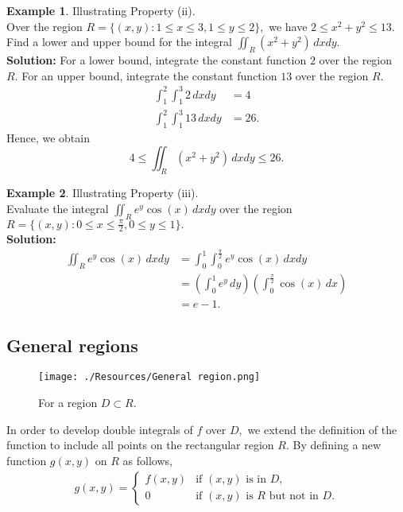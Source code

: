 \documentclass[12pt, a4paper]{article}
\newcommand{\f}[2]{\frac{#1}{#2}}
\theoremstyle{definition}
\newtheorem*{example}{Example}
\theoremstyle{plain}
\begin{document}
\begin{example}
Illustrating Property (ii). \\
Over the region $R=\{(x,y): 1\leq x \leq 3, 1\leq y \leq 2\},$ we have $2\leq x^2+y^2\leq 13.$ Find a lower and upper bound for the integral $\iint_R (x^2+y^2) \, dxdy.$ \\
\textbf{Solution:} For a lower bound, integrate the constant function $2$ over the region $R.$ For an upper bound, integrate the constant function $13$ over the region $R.$
$$\begin{aligned}
\int_1^2\int_1^3 2 \, dxdy &= 4 \\
\int_1^2\int_1^3 13 \, dxdy &= 26.
\end{aligned}$$ Hence, we obtain $$4 \leq \iint_R (x^2+y^2) \, dxdy \leq 26.$$
\end{example}

\begin{example}
Illustrating Property (iii).\\
Evaluate the integral $\iint_R e^y \cos(x) \, dxdy$ over the region $R=\{(x,y):0\leq x\leq \f{\pi}{2}, 0 \leq y \leq 1\}.$\\
\textbf{Solution:} $$\begin{aligned}
\iint_R e^y \cos(x) \, dxdy &= \int_0^1 \int_0^{\frac{\pi}{2}} e^y \cos(x) \, dxdy \\
&= \left(\int_0^1 e^y \, dy\right)\left(\int_0^{\frac{\pi}{2}} \cos(x) \, dx\right) \\
&= e-1.
\end{aligned}$$
\end{example}

\subsection{General regions}

\begin{figure}[H]
\centering
\texttt{[image: ./Resources/General region.png]}
\caption{For a region $D \subset R.$}
\label{fig:General region}
\end{figure}

In order to develop double integrals of $f$ over $D,$ we extend the definition of the function to include all points on the rectangular region $R.$ By defining a new function $g(x,y)$ on $R$ as follows, $$\begin{aligned}
g(x,y)= \begin{cases}
f(x,y) &\text{if $(x,y)$ is in $D,$}\\
0 		&\text{if $(x,y)$ is $R$ but not in $D.$}
\end{cases}
\end{aligned}$$
\end{document}
